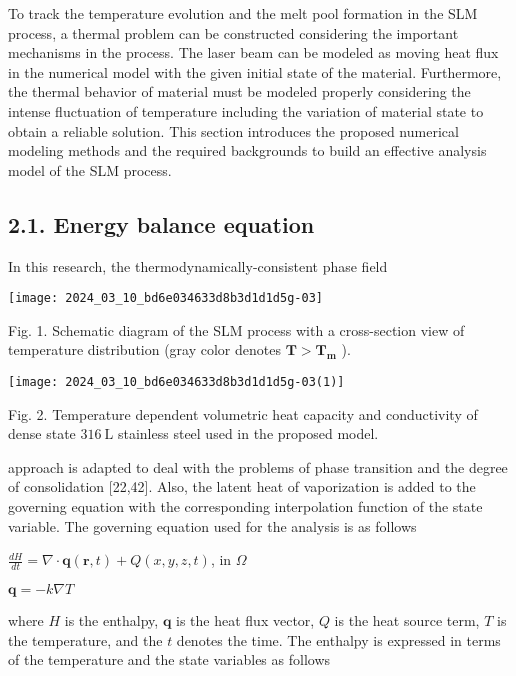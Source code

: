\documentclass[10pt]{article}
\begin{document}
To track the temperature evolution and the melt pool formation in the SLM process, a thermal problem can be constructed considering the important mechanisms in the process. The laser beam can be modeled as moving heat flux in the numerical model with the given initial state of the material. Furthermore, the thermal behavior of material must be modeled properly considering the intense fluctuation of temperature including the variation of material state to obtain a reliable solution. This section introduces the proposed numerical modeling methods and the required backgrounds to build an effective analysis model of the SLM process.

\subsection*{2.1. Energy balance equation}
In this research, the thermodynamically-consistent phase field

\begin{center}
\texttt{[image: 2024\_03\_10\_bd6e034633d8b3d1d1d5g-03]}
\end{center}

Fig. 1. Schematic diagram of the SLM process with a cross-section view of temperature distribution (gray color denotes $\boldsymbol{T}>\boldsymbol{T}_{\boldsymbol{m}}$ ).

\begin{center}
\texttt{[image: 2024\_03\_10\_bd6e034633d8b3d1d1d5g-03(1)]}
\end{center}

Fig. 2. Temperature dependent volumetric heat capacity and conductivity of dense state $316 \mathrm{~L}$ stainless steel used in the proposed model.

approach is adapted to deal with the problems of phase transition and the degree of consolidation [22,42]. Also, the latent heat of vaporization is added to the governing equation with the corresponding interpolation function of the state variable. The governing equation used for the analysis is as follows

$\frac{d H}{d t}=\nabla \cdot \boldsymbol{q}(\boldsymbol{r}, t)+Q(x, y, z, t)$, in $\Omega$

$\boldsymbol{q}=-k \nabla T$

where $H$ is the enthalpy, $\mathbf{q}$ is the heat flux vector, $Q$ is the heat source term, $T$ is the temperature, and the $t$ denotes the time. The enthalpy is expressed in terms of the temperature and the state variables as follows
\end{document}
